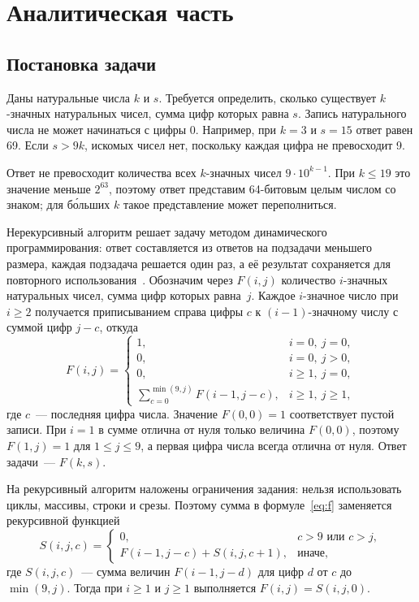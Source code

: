 \clearpage
\section{Аналитическая часть}

\subsection{Постановка задачи}

Даны натуральные числа $k$ и $s$. Требуется определить, сколько существует
$k$-значных натуральных чисел, сумма цифр которых равна $s$. Запись натурального
числа не может начинаться с цифры 0. Например, при $k=3$ и $s=15$ ответ равен 69.
Если $s>9k$, искомых чисел нет, поскольку каждая цифра не превосходит 9.

Ответ не превосходит количества всех $k$-значных чисел $9\cdot10^{k-1}$.
При $k\le19$ это значение меньше $2^{63}$, поэтому ответ представим
64-битовым целым числом со знаком; для б\'{о}льших $k$ такое представление
может переполниться.

Нерекурсивный алгоритм решает задачу методом динамического
программирования: ответ составляется
из ответов на подзадачи меньшего размера, каждая подзадача решается один раз,
а её результат сохраняется для повторного использования~\cite{laaksonen}.
Обозначим через $F(i,j)$ количество $i$-значных натуральных чисел, сумма цифр
которых равна~$j$. Каждое $i$-значное число при $i\ge2$ получается приписыванием
справа цифры $c$ к $(i-1)$-значному числу с суммой цифр $j-c$, откуда
\begin{equation}
    \label{eq:f}
    F(i,j)=
    \begin{cases}
        1, & i=0,\ j=0,\\
        0, & i=0,\ j>0,\\
        0, & i\ge1,\ j=0,\\
        \sum\limits_{c=0}^{\min(9,j)}F(i-1,j-c), & i\ge1,\ j\ge1,
    \end{cases}
\end{equation}
где $c$~--- последняя цифра числа. Значение $F(0,0)=1$ соответствует пустой
записи. При $i=1$ в сумме отлична от нуля только величина $F(0,0)$, поэтому
$F(1,j)=1$ для $1\le j\le9$, а первая цифра числа всегда отлична от нуля.
Ответ задачи~--- $F(k,s)$.

На рекурсивный алгоритм наложены ограничения задания: нельзя использовать циклы,
массивы, строки и срезы. Поэтому сумма в формуле~\eqref{eq:f} заменяется
рекурсивной функцией
\begin{equation}
    \label{eq:s}
    S(i,j,c)=
    \begin{cases}
        0, & c>9 \text{ или } c>j,\\
        F(i-1,j-c)+S(i,j,c+1), & \text{иначе},
    \end{cases}
\end{equation}
где $S(i,j,c)$~--- сумма величин $F(i-1,j-d)$ для цифр $d$ от $c$ до $\min(9,j)$.
Тогда при $i\ge1$ и $j\ge1$ выполняется $F(i,j)=S(i,j,0)$.

